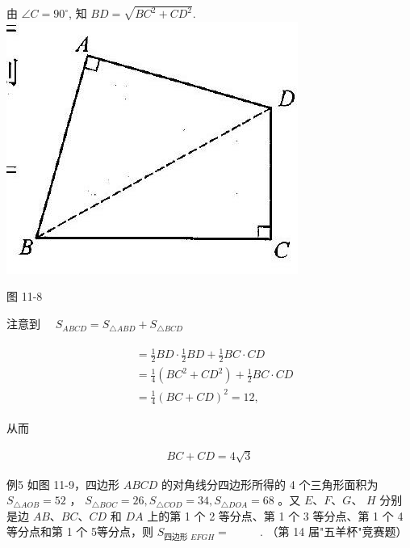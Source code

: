 \documentclass[10pt]{article}
\begin{document}
由 $\angle C=90^{\circ}$, 知 $B D=\sqrt{B C^{2}+C D^{2}}$.\\
\includegraphics[max width=\textwidth, center]{2024_10_30_2c8f45efd4a519b08e1ag-105}

图 11-8

注意到 $\quad S_{A B C D}=S_{\triangle A B D}+S_{\triangle B C D}$

\begin{align*}
\begin{aligned}
& =\frac{1}{2} B D \cdot \frac{1}{2} B D+\frac{1}{2} B C \cdot C D \\
& =\frac{1}{4}\left(B C^{2}+C D^{2}\right)+\frac{1}{2} B C \cdot C D \\
& =\frac{1}{4}(B C+C D)^{2}=12,
\end{aligned}
\end{align*}

从而

\begin{align*}
B C+C D=4 \sqrt{3}
\end{align*}

例5 如图 11-9，四边形 $A B C D$ 的对角线分四边形所得的 4 个三角形面积为 $S_{\triangle A O B}=52$ ， $S_{\triangle B O C}=26, S_{\triangle C O D}=34, S_{\triangle D O A}=68$ 。又 $E 、 F 、 G 、$ $H$ 分别是边 $A B 、 B C 、 C D$ 和 $D A$ 上的第 1 个 2 等分点、第 1 个 3 等分点、第 1 个 4 等分点和第 1 个 5等分点，则 $S_{\text {四边形 } E F G H}=$ $\qquad$ . （第 14 届"五羊杯"竞赛题）
\end{document}

